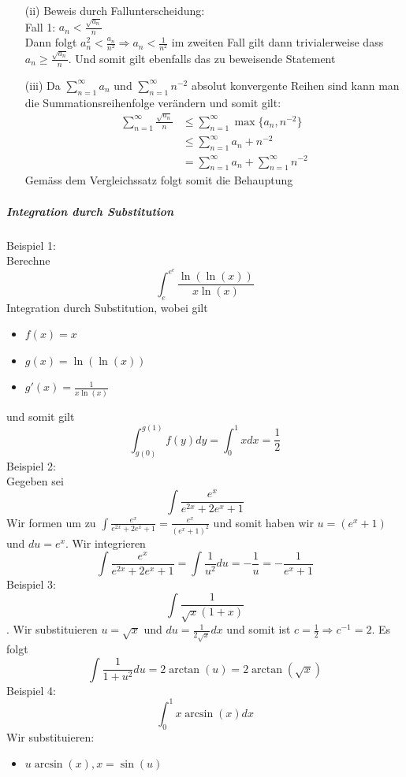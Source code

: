 \documentclass[7pt,landscape, margin = 0.1mm]{article}
\begin{document}
\begin{multicols}{4}
\begin{flushleft}
\begin{flushleft}
\begin{itemize}
\item[(ii)] Beweis durch Fallunterscheidung: \\ Fall 1: $a_n < \frac{\sqrt{a_n}}{n}$\\ Dann folgt  $a_n^2 < \frac{a_n}{n^2} \Rightarrow a_n < \frac{1}{n^2}$ im zweiten Fall gilt dann trivialerweise dass $a_n \geq \frac{\sqrt{a_n}}{n}$. Und somit gilt ebenfalls das zu beweisende Statement
\item[(iii)] Da $\sum_{n=1}^{\infty} a_n$ und $\sum_{n=1}^{\infty} n^{-2}$ absolut konvergente Reihen sind kann man die Summationsreihenfolge verändern und somit gilt:
\begin{align*}
\sum_{n=1}^{\infty} \frac{\sqrt{a_n}}{n} &\leq \sum_{n=1}^{\infty} \operatorname{max}\{a_n, n^{-2}\} \\ &\leq \sum_{n=1}^{\infty} a_n + n^{-2} \\ &=  \sum_{n=1}^{\infty} a_n + \sum_{n=1}^{\infty} n^{-2} 
\end{align*} Gemäss dem Vergleichssatz folgt somit die Behauptung
\end{itemize}
\vspace{1mm} \hline \vspace{1mm}
\subparagraph{Integration durch Substitution}
Beispiel 1:\\
Berechne $$\int_{e}^{e^e} \frac{\ln(\ln(x))}{x \ln(x)}$$
Integration durch Substitution, wobei gilt
\begin{itemize}
\item $f(x)=x$
\item $g(x) = \ln(\ln(x))$
\item $g'(x) =  \frac{1}{x \ln(x)}$
\end{itemize}
und somit gilt
$$\int_{g(0)}^{g(1)} f(y)dy = \int_{0}^{1} x dx = \frac{1}{2}$$ 
Beispiel 2:\\
Gegeben sei $$\int \frac{e^x}{e^{2x}+2e^x+1}$$
Wir formen um zu
$\int \frac{e^x}{e^{2x}+2e^x+1} = \frac{e^x}{(e^x+1)^2}$ und somit haben wir $u = (e^x+1)$ und $du=e^x$. Wir integrieren
$$\int \frac{e^x}{e^{2x}+2e^x+1}=\int \frac{1}{u^2}du = -\frac{1}{u} = -\frac{1}{e^x+1}$$
Beispiel 3:\\
$$\int \frac{1}{\sqrt{x}(1+x)}$$. Wir substituieren $u = \sqrt{x}$ und $du = \frac{1}{2\sqrt{x}} dx$ und somit ist $c=\frac{1}{2} \Rightarrow c^{-1} = 2$. Es folgt $$\int \frac{1}{1+u^2} du = 2\arctan(u) = 2\arctan(\sqrt{x})$$
Beispiel 4:\\
$$\int_{0}^{1} x \arcsin(x) dx$$
Wir substituieren:
\begin{itemize}
\item $u \arcsin(x), x = \sin(u)$

\end{itemize}
\end{flushleft}
\end{flushleft}
\end{multicols}
\end{document}
